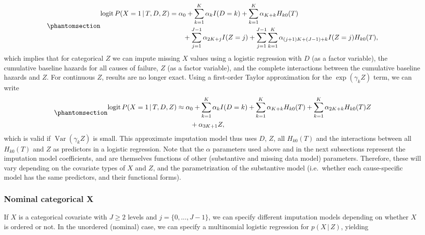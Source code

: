 \documentclass[
  letterpaper,
  DIV=11,
  numbers=noendperiod]{scrreprt}
\DeclareMathOperator{\logit}{logit}
\DeclareMathOperator{\Var}{Var}
\newcommand{\given}{\,|\,}
\begin{document}
\begin{equation}\phantomsection\label{eq-Xbin-Zcat}{
\begin{aligned}
    \logit P(X = 1 \given T, D, Z) &= \alpha_0 + \sum^K_{k = 1}\alpha_k I(D=k) + \sum^K_{k = 1} \alpha_{K+k} H_{k0}(T) \nonumber \\
    &\qquad + \sum^{J-1}_{j=1}\alpha_{2K + j}I(Z = j) + \sum^{J-1}_{j=1} \sum^K_{k = 1} \alpha_{(j+1)K + (J-1) + k}I(Z = j) H_{k0}(T),
\end{aligned}
}\end{equation} which implies that for categorical \(Z\) we can impute
missing \(X\) values using a logistic regression with \(D\) (as a factor
variable), the cumulative baseline hazards for all causes of failure,
\(Z\) (as a factor variable), and the complete interactions between the
cumulative baseline hazards and \(Z\). For continuous \(Z\), results are
no longer exact. Using a first-order Taylor approximation for the
\(\exp(\gamma_k Z)\) term, we can write
\begin{equation}\phantomsection\label{eq-Xbin-Zcontin}{
\begin{aligned}
    \logit P(X = 1 \given T, D, Z) &\approx \alpha_0  + \sum^K_{k = 1} \alpha_{k} I(D=k) + \sum^K_{k = 1} \alpha_{K + k} H_{k0}(T) + \sum^K_{k = 1} \alpha_{2K + k} H_{k0}(T) Z \nonumber \\
    &\qquad + \alpha_{3K + 1} Z,
\end{aligned}
}\end{equation} which is valid if \(\Var(\gamma_k Z)\) is small. This
approximate imputation model thus uses \(D\), \(Z\), all \(H_{k0}(T)\)
and the interactions between all \(H_{k0}(T)\) and \(Z\) as predictors
in a logistic regression. Note that the \(\alpha\) parameters used above
and in the next subsections represent the imputation model coefficients,
and are themselves functions of other (substantive and missing data
model) parameters. Therefore, these will vary depending on the covariate
types of \(X\) and \(Z\), and the parametrization of the substantive
model (i.e.~whether each cause-specific model has the same predictors,
and their functional forms).

\subsubsection{Nominal categorical X}\label{nominal-categorical-x}

If \(X\) is a categorical covariate with \(J \geq 2\) levels and
\(j = \{0,..., J-1\}\), we can specify different imputation models
depending on whether \(X\) is ordered or not. In the unordered (nominal)
case, we can specify a multinomial logistic regression for
\(p(X \given Z)\), yielding
\end{document}
